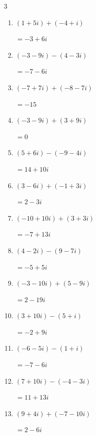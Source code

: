 \begin{multicols}{3}
\begin{enumerate}
        $\displaystyle =12-5i$

  \item $\displaystyle (1+5i) + (-4+i)$

        $\displaystyle =-3+6i$

  \item $\displaystyle (-3-9i) - (4-3i)$

        $\displaystyle =-7-6i$

  \item $\displaystyle (-7+7i) + (-8-7i)$

        $\displaystyle =-15$

  \item $\displaystyle (-3-9i) + (3+9i)$

        $\displaystyle =0$

  \item $\displaystyle (5+6i) - (-9-4i)$

        $\displaystyle =14+10i$

\columnbreak %

  \item $\displaystyle (3-6i) + (-1+3i)$

        $\displaystyle =2-3i$

  \item $\displaystyle (-10+10i) + (3+3i)$

        $\displaystyle =-7+13i$

  \item $\displaystyle (4-2i) - (9-7i)$

        $\displaystyle =-5+5i$

  \item $\displaystyle (-3-10i) + (5-9i)$

        $\displaystyle =2-19i$

  \item $\displaystyle (3+10i) - (5+i)$

        $\displaystyle =-2+9i$

  \item $\displaystyle (-6-5i) - (1+i)$

        $\displaystyle =-7-6i$

  \item $\displaystyle (7+10i) - (-4-3i)$

        $\displaystyle =11+13i$

  \item $\displaystyle (9+4i) + (-7-10i)$

        $\displaystyle =2-6i$


\end{enumerate}
\end{multicols}

